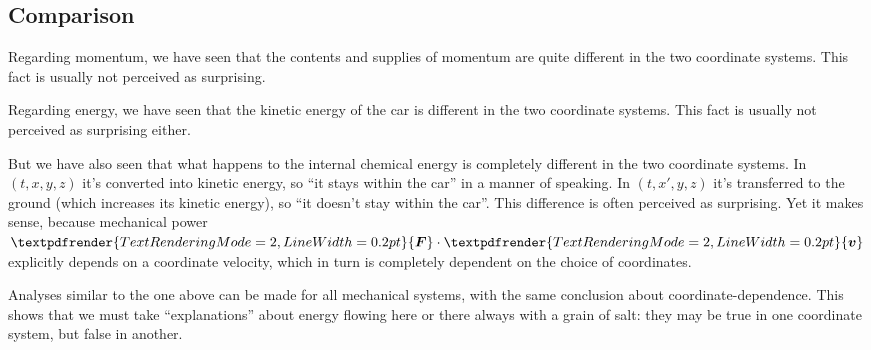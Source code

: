 \documentclass[a4paper,12pt,%
onecolumn,oneside,%
british%
]{memoir}
\renewcommand*{\bm}[1]{\textpdfrender{TextRenderingMode=2,LineWidth=0.2pt}{\boldsymbol{#1}}}
\renewcommand*{\|}[1][]{\nonscript\:#1\vert\nonscript\:\mathopen{}}
\newcommand*{\yv}{\bm{v}}
\newcommand*{\yF}{\bm{F}}
\begin{document}
\subsection{Comparison}
\label{sec:coord_E_comp}

Regarding momentum, we have seen that the contents and supplies of momentum are quite different in the two coordinate systems. This fact is usually not perceived as surprising.

Regarding energy, we have seen that the kinetic energy of the car is different in the two coordinate systems. This fact is usually not perceived as surprising either.

But we have also seen that what happens to the internal chemical energy is completely different in the two coordinate systems. In $(t,x,y,z)$ it's converted into kinetic energy, so \enquote{it stays within the car} in a manner of speaking. In $(t,x',y,z)$ it's transferred to the ground (which increases its kinetic energy), so \enquote{it doesn't stay within the car}. This difference is often perceived as surprising. Yet it makes sense, because mechanical power $\yF\cdot\yv$ explicitly depends on a coordinate velocity, which in turn is completely dependent on the choice of coordinates.

\medskip

Analyses similar to the one above can be made for all mechanical systems, with the same conclusion about coordinate-dependence. This shows that we must take \enquote{explanations} about energy flowing here or there always with a grain of salt: they may be true in one coordinate system, but false in another.
\end{document}
